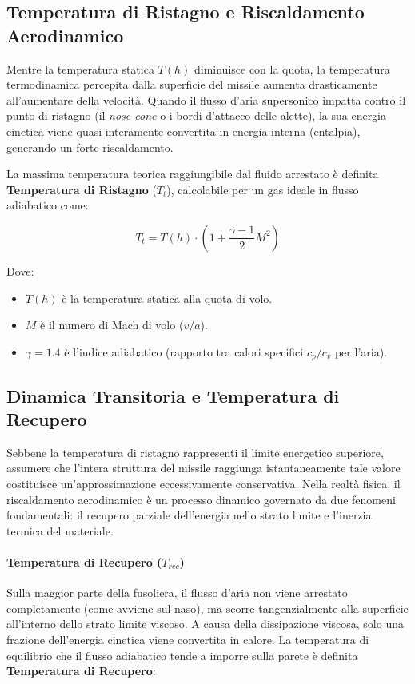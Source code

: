 \documentclass[12pt,a4paper]{article}
\begin{document}
\subsection{Temperatura di Ristagno e Riscaldamento Aerodinamico}
Mentre la temperatura statica $T(h)$ diminuisce con la quota, la temperatura termodinamica percepita dalla superficie del missile aumenta drasticamente all'aumentare della velocità. Quando il flusso d'aria supersonico impatta contro il punto di ristagno (il \textit{nose cone} o i bordi d'attacco delle alette), la sua energia cinetica viene quasi interamente convertita in energia interna (entalpia), generando un forte riscaldamento.

La massima temperatura teorica raggiungibile dal fluido arrestato è definita \textbf{Temperatura di Ristagno} ($T_t$), calcolabile per un gas ideale in flusso adiabatico come:

\begin{equation}
    T_t = T(h) \cdot \left( 1 + \frac{\gamma - 1}{2} M^2 \right)
\end{equation}

Dove:
\begin{itemize}
    \item $T(h)$ è la temperatura statica alla quota di volo.
    \item $M$ è il numero di Mach di volo ($v / a$).
    \item $\gamma = 1.4$ è l'indice adiabatico (rapporto tra calori specifici $c_p/c_v$ per l'aria).
\end{itemize}

\subsection{Dinamica Transitoria e Temperatura di Recupero}
Sebbene la temperatura di ristagno rappresenti il limite energetico superiore, assumere che l'intera struttura del missile raggiunga istantaneamente tale valore costituisce un'approssimazione eccessivamente conservativa. Nella realtà fisica, il riscaldamento aerodinamico è un processo dinamico governato da due fenomeni fondamentali: il recupero parziale dell'energia nello strato limite e l'inerzia termica del materiale.

\paragraph{Temperatura di Recupero ($T_{rec}$)}
Sulla maggior parte della fusoliera, il flusso d'aria non viene arrestato completamente (come avviene sul naso), ma scorre tangenzialmente alla superficie all'interno dello strato limite viscoso. A causa della dissipazione viscosa, solo una frazione dell'energia cinetica viene convertita in calore. La temperatura di equilibrio che il flusso adiabatico tende a imporre sulla parete è definita \textbf{Temperatura di Recupero}:
\end{document}
